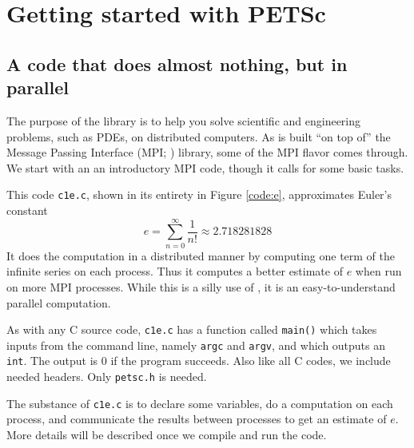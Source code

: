 
\chapter{Getting started with PETSc}
\label{chap:getstarted}

\section{A code that does almost nothing, but in parallel}

The purpose of the \PETSc library is to help you solve scientific and engineering problems, such as PDEs, on distributed computers.  As \PETSc is built ``on top of'' the Message Passing Interface (MPI; \citep{Groppetal1999}) library, some of the MPI flavor comes through.  We start with an an introductory MPI code, though it calls \PETSc for some basic tasks.

This code \texttt{c1e.c}, shown in its entirety in Figure \ref{code:e}, approximates Euler's constant
\begin{equation}
e = \sum_{n = 0}^\infty \frac{1}{n!} \approx 2.718281828 \label{introeseries}
\end{equation}
It does the computation in a distributed manner by computing one term of the infinite series on each process.  Thus it computes a better estimate of $e$ when run on more MPI processes. While this is a silly use of \PETSc, it is an easy-to-understand parallel computation.

As with any C source code, \texttt{c1e.c} has a function called \texttt{main()} which takes inputs from the command line, namely \texttt{argc} and \texttt{argv}, and which outputs an \texttt{int}.  The output is $0$ if the program succeeds.  Also like all C codes, we include needed headers.  Only \texttt{petsc.h} is needed.

The substance of \texttt{c1e.c} is to declare some variables, do a computation on each process, and communicate the results between processes to get an estimate of $e$.  More details will be described once we compile and run the code.

